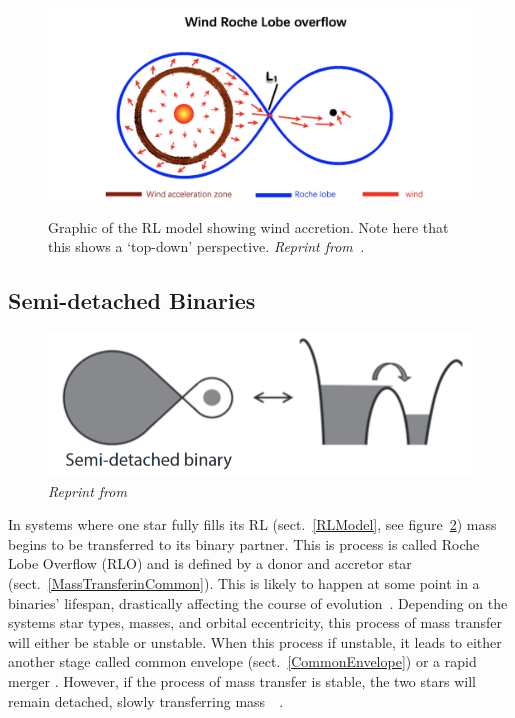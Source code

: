 \documentclass[12pt, a4paper]{article}
\begin{document}
        \begin{figure}[H]
            \centering
            \includegraphics[width = .8\textwidth]{figs/reused-figs/Tauris_WindRocheLobeOverflow.png}\\
            \caption{Graphic of the RL model showing wind accretion. Note here that this shows a `top-down' perspective. 
            \textit{Reprint from~\parencite{TaurisvandenHeuvel+2023}.}}
            \label{fig:RLWindAccretion}
        \end{figure}
        
        \subsection{Semi-detached Binaries}\label{RLO} %

        \begin{figure}[H] 
            \centering
            \includegraphics[scale = .4]{figs/reused-figs/Tauris_Semi-detachedBinary.png}
            \caption{\textit{Reprint from~\parencite{TaurisvandenHeuvel+2023}}}
            \label{SemidetachedRL}
        \end{figure}

        In systems where one star fully fills its RL (sect.~\ref{RLModel}, see figure~\ref{SemidetachedRL}) mass begins to be transferred to its binary partner. This is process is called Roche Lobe Overflow (RLO) and is defined by a donor and accretor star (sect.~\ref{MassTransferinCommon}). This is likely to happen at some point in a binaries' lifespan, drastically affecting the course of evolution~\parencite{TaurisvandenHeuvel+2023}\parencite{Chen_2024}. Depending on the systems star types, masses, and orbital eccentricity, this process of mass transfer will either be stable or unstable. When this process if unstable, it leads to either another stage called common envelope (sect.~\ref{CommonEnvelope}) or a rapid merger \parencite{TaurisvandenHeuvel+2023}. However, if the process of mass transfer is stable, the two stars will remain detached, slowly transferring mass~\parencite{Chen_2024}~\parencite{TaurisvandenHeuvel+2023}.
\end{document}
